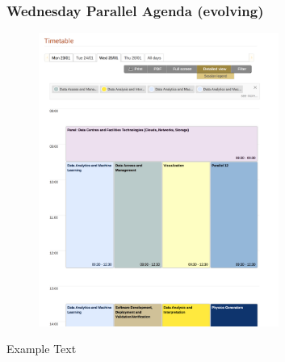 \begin{frame}
\frametitle{Wednesday Parallel Agenda (evolving)}

\begin{figure}[htbp]
\begin{center}
\includegraphics[width=0.7\textwidth]{images/20161214-HSF-SDSC-Workshop-2.png}
\end{center}
\end{figure}

\small{Example Text}

\end{frame}


